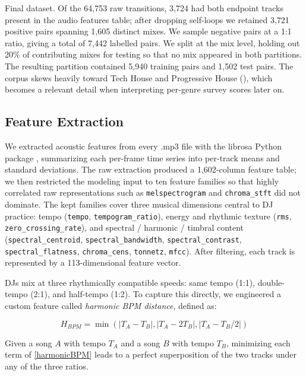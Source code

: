 \documentclass{article}
\begin{document}
Final dataset. Of the 64{,}753 raw transitions, 3{,}724 had both endpoint tracks present in the audio features table; after dropping self-loops we retained 3{,}721 positive pairs spanning 1{,}605 distinct mixes. We sample negative pairs at a 1:1 ratio, giving a total of 7{,}442 labelled pairs. We split at the mix level, holding out 20\% of contributing mixes for testing so that no mix appeared in both partitions. The resulting partition contained 5{,}940 training pairs and 1{,}502 test pairs. The corpus skews heavily toward Tech House and Progressive House (), which becomes a relevant detail when interpreting per-genre survey scores later on.



\subsection{Feature Extraction}

We extracted acoustic features from every .mp3 file with the librosa Python package \citep{mcfee2015librosa}, summarizing each per-frame time series into per-track means and standard deviations. The raw extraction produced a 1{,}602-column feature table; we then restricted the modeling input to ten feature families so that highly correlated raw representations such as \texttt{melspectrogram} and \texttt{chroma\_stft} did not dominate. The kept families cover three musical dimensions central to DJ practice: tempo (\texttt{tempo}, \texttt{tempogram\_ratio}), energy and rhythmic texture (\texttt{rms}, \texttt{zero\_crossing\_rate}), and spectral / harmonic / timbral content (\texttt{spectral\_centroid}, \texttt{spectral\_bandwidth}, \texttt{spectral\_contrast}, \texttt{spectral\_flatness}, \texttt{chroma\_cens}, \texttt{tonnetz}, \texttt{mfcc}). After filtering, each track is represented by a 113-dimensional feature vector.

DJs mix at three rhythmically compatible speeds: same tempo (1:1), double-tempo (2:1), and half-tempo (1:2). To capture this directly, we engineered a custom feature called \emph{harmonic BPM distance}, defined as:

\begin{equation}
\label{harmonicBPM}
    H_{BPM} = \min(|T_A - T_B|, |T_A - 2T_B|, |T_A - T_B/2|)
\end{equation}

Given a song $A$ with tempo $T_A$ and a song $B$ with tempo $T_B$, minimizing each term of \cref{harmonicBPM} leads to a perfect superposition of the two tracks under any of the three ratios.
\end{document}
